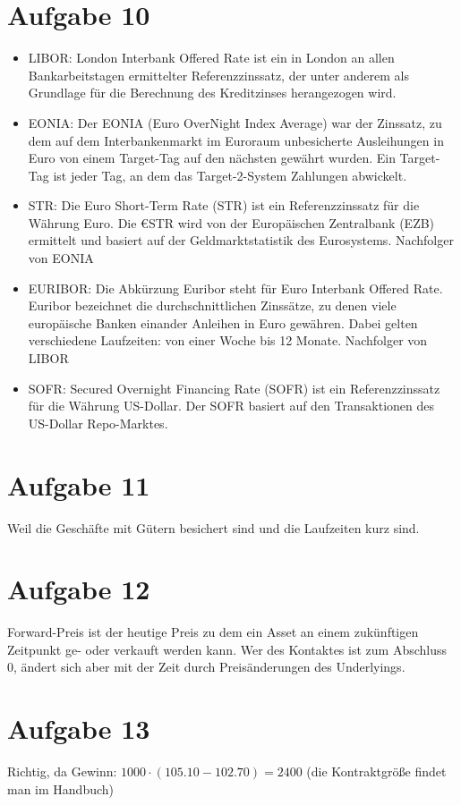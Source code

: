 \documentclass{article}
\begin{document}
	\section*{Aufgabe 10}
	\begin{itemize}
		\item LIBOR: London Interbank Offered Rate ist ein in London an allen Bankarbeitstagen ermittelter Referenzzinssatz, der unter anderem als Grundlage für die Berechnung des Kreditzinses herangezogen wird.
		\item EONIA: Der EONIA (Euro OverNight Index Average) war der Zinssatz, zu dem auf dem Interbankenmarkt im Euroraum unbesicherte Ausleihungen in Euro von einem Target-Tag auf den nächsten gewährt wurden. Ein Target-Tag ist jeder Tag, an dem das Target-2-System Zahlungen abwickelt.
		\item \EUR STR: Die Euro Short-Term Rate (\EUR STR) ist ein Referenzzinssatz für die Währung Euro. Die €STR wird von der Europäischen Zentralbank (EZB) ermittelt und basiert auf der Geldmarktstatistik des Eurosystems. Nachfolger von EONIA
		\item EURIBOR: Die Abkürzung Euribor steht für Euro Interbank Offered Rate. Euribor bezeichnet die durchschnittlichen Zinssätze, zu denen viele europäische Banken einander Anleihen in Euro gewähren. Dabei gelten verschiedene Laufzeiten: von einer Woche bis 12 Monate. Nachfolger von LIBOR
		\item SOFR: Secured Overnight Financing Rate (SOFR) ist ein Referenzzinssatz für die Währung US-Dollar. Der SOFR basiert auf den Transaktionen des US-Dollar Repo-Marktes.
	\end{itemize}
	
	\section*{Aufgabe 11}
	Weil die Geschäfte mit Gütern besichert sind und die Laufzeiten kurz sind.
	
	\section*{Aufgabe 12}
	Forward-Preis ist der heutige Preis zu dem ein Asset an einem zukünftigen Zeitpunkt ge- oder verkauft werden kann. Wer des Kontaktes ist zum Abschluss 0, ändert sich aber mit der Zeit durch Preisänderungen des Underlyings.
	
	\section*{Aufgabe 13}
	Richtig, da Gewinn: $1000\cdot (105.10 - 102.70) = 2400$ (die Kontraktgröße findet man im Handbuch)
	
\end{document}
